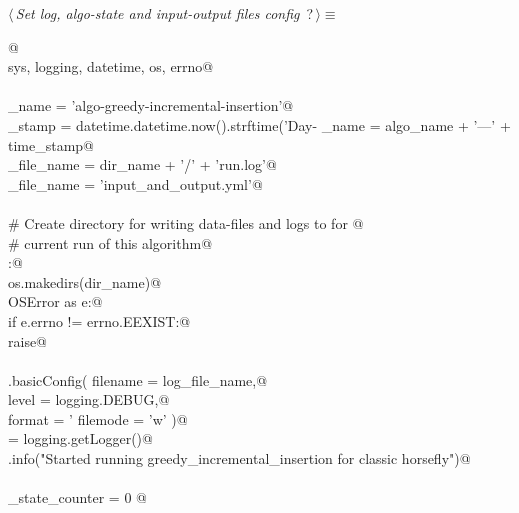 \documentclass[11.5pt]{report}
\begin{document}
\begin{flushleft} \small\label{scrap23}\raggedright\small
{} $\langle\,${\itshape Set log, algo-state and input-output files config}\nobreak\ {\footnotesize {?}}$\,\rangle\equiv$
\vspace{-1ex}
\begin{list}{}{} \item
\mbox{}\verb@  @\\
\mbox{}\verb@import sys, logging, datetime, os, errno@\\
\mbox{}\verb@@\\
\mbox{}\verb@algo_name     = 'algo-greedy-incremental-insertion'@\\
\mbox{}\verb@time_stamp    = datetime.datetime.now().strftime('Day-%Y-%m-%d_ClockTime-%H:%M:%S')@\\
\mbox{}\verb@dir_name      = algo_name + '---' + time_stamp@\\
\mbox{}\verb@log_file_name = dir_name + '/' + 'run.log'@\\
\mbox{}\verb@io_file_name  = 'input_and_output.yml'@\\
\mbox{}\verb@@\\
\mbox{}\verb@# Create directory for writing data-files and logs to for @\\
\mbox{}\verb@# current run of this algorithm@\\
\mbox{}\verb@try:@\\
\mbox{}\verb@    os.makedirs(dir_name)@\\
\mbox{}\verb@except OSError as e:@\\
\mbox{}\verb@    if e.errno != errno.EEXIST:@\\
\mbox{}\verb@        raise@\\
\mbox{}\verb@@\\
\mbox{}\verb@logging.basicConfig( filename = log_file_name,@\\
\mbox{}\verb@                     level    = logging.DEBUG,@\\
\mbox{}\verb@                     format   = '%(asctime)s: %(levelname)s: %(message)s',@\\
\mbox{}\verb@                     filemode = 'w' )@\\
\mbox{}\verb@logger = logging.getLogger()@\\
\mbox{}\verb@logger.info("Started running greedy_incremental_insertion for classic horsefly")@\\
\mbox{}\verb@@\\
\mbox{}\verb@algo_state_counter = 0 @\\

\end{list}
\end{flushleft}
\end{document}

